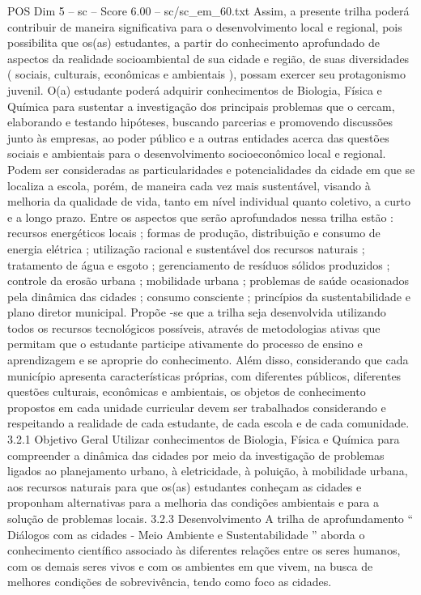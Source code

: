 \begin{textsample}{POS Dim 5 – sc – Score 6.00 – sc/sc\_em\_60.txt}
Assim, a presente trilha poderá contribuir de maneira significativa para o desenvolvimento local e regional, pois possibilita que os(as) estudantes, a partir do conhecimento aprofundado de aspectos da realidade socioambiental de sua cidade e região, de suas diversidades ( sociais, culturais, econômicas e ambientais ), possam exercer seu protagonismo juvenil.
O(a) estudante poderá adquirir conhecimentos de Biologia, Física e Química para sustentar a investigação dos principais problemas que o cercam, elaborando e testando hipóteses, buscando parcerias e promovendo discussões junto às empresas, ao poder público e a outras entidades acerca das questões sociais e ambientais para o desenvolvimento socioeconômico local e regional.
Podem ser consideradas as particularidades e potencialidades da cidade em que se localiza a escola, porém, de maneira cada vez mais sustentável, visando à melhoria da qualidade de vida, tanto em nível individual quanto coletivo, a curto e a longo prazo.
Entre os aspectos que serão aprofundados nessa trilha estão : recursos energéticos locais ; formas de produção, distribuição e consumo de energia elétrica ; utilização racional e sustentável dos recursos naturais ; tratamento de água e esgoto ; gerenciamento de resíduos sólidos produzidos ; controle da erosão urbana ; mobilidade urbana ; problemas de saúde ocasionados pela dinâmica das cidades ; consumo consciente ; princípios da sustentabilidade e plano diretor municipal.
Propõe -se que a trilha seja desenvolvida utilizando todos os recursos tecnológicos possíveis, através de metodologias ativas que permitam que o estudante participe ativamente do processo de ensino e aprendizagem e se aproprie do conhecimento.
Além disso, considerando que cada município apresenta características próprias, com diferentes públicos, diferentes questões culturais, econômicas e ambientais, os objetos de conhecimento propostos em cada unidade curricular devem ser trabalhados considerando e respeitando a realidade de cada estudante, de cada escola e de cada comunidade. 3.2.1 Objetivo Geral Utilizar conhecimentos de Biologia, Física e Química para compreender a dinâmica das cidades por meio da investigação de problemas ligados ao planejamento urbano, à eletricidade, à poluição, à mobilidade urbana, aos recursos naturais para que os(as) estudantes conheçam as cidades e proponham alternativas para a melhoria das condições ambientais e para a solução de problemas locais. 3.2.3 Desenvolvimento A trilha de aprofundamento “ Diálogos com as cidades - Meio Ambiente e Sustentabilidade ” aborda o conhecimento científico associado às diferentes relações entre os seres humanos, com os demais seres vivos e com os ambientes em que vivem, na busca de melhores condições de sobrevivência, tendo como foco as cidades.

\end{textsample}

